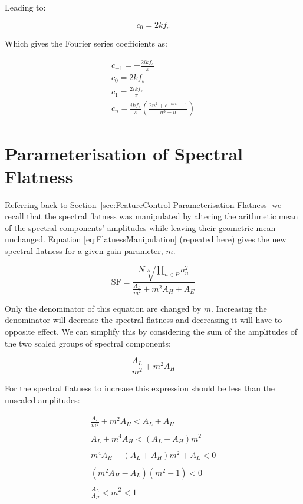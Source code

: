 \begin{appendices}
		Leading to:

		\[ c_{0} = 2kf_{s} \]

		Which gives the Fourier series coefficients as:

		\begin{gather}
			c_{-1} = - \frac{2ikf_{s}}{\pi} \nonumber \\
			c_{0} = 2kf_{s} \nonumber \\
			c_{1} = \frac{2ikf_{s}}{\pi} \nonumber \\
			c_{n} = \frac{ikf_{s}}{\pi} \left( \frac{2n^{2} + e^{-in\pi} - 1}{n^{3} - n} \right) \nonumber
		\end{gather}

	\section{Parameterisation of Spectral Flatness}
	\label{app:MathematicalDerivations-SpectralFlatness}
		Referring back to Section~\ref{sec:FeatureControl-Parameterisation-Flatness} we recall that the spectral
		flatness was manipulated by altering the arithmetic mean of the spectral components' amplitudes while
		leaving their geometric mean unchanged.	Equation \ref{eq:FlatnessManipulation} (repeated here) gives the new
		spectral flatness for a given gain parameter, $m$.

		\[ \mathrm{SF} = \frac{N\sqrt[N]{\prod_{n \in P} a_{n}^{2}}}
					   {\frac{A_{L}}{m^{2}} + m^{2}A_{H} + A_{E}} \]

		Only the denominator of this equation are changed by $m$. Increasing the denominator will decrease the
		spectral flatness and decreasing it will have to opposite effect. We can simplify this by considering the
		sum of the amplitudes of the two scaled groups of spectral components:

		\[ \frac{A_{L}}{m^{2}} + m^{2}A_{H} \]

		For the spectral flatness to increase this expression should be less than the unscaled amplitudes:

		\begin{gather}
			\frac{A_{L}}{m^{2}} + m^{2}A_{H} < A_{L} + A_{H} \nonumber \\
			\nonumber \\
			A_{L} + m^{4}A_{H} < (A_{L} + A_{H})m^{2} \nonumber \\
			\nonumber \\
			m^{4}A_{H} - (A_{L} + A_{H})m^{2} + A_{L} < 0 \nonumber \\
			\nonumber \\
			(m^{2}A_{H} - A_{L})(m^{2} - 1) < 0 \nonumber \\
			\nonumber \\
			\frac{A_{L}}{A_{H}} < m^{2} < 1 \nonumber
		\end{gather}


\end{appendices}
